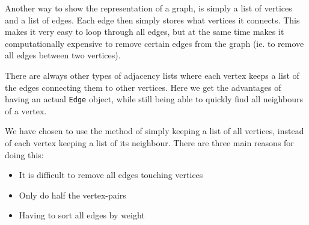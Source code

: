 Another way to show the representation of a graph, is simply a list of vertices and a list of edges. 
Each edge then simply stores what vertices it connects. 
This makes it very easy to loop through all edges, but at the same time makes it computationally expensive to remove certain edges from the graph (ie. 
to remove all edges between two vertices).

There are always other types of adjacency lists where each vertex keeps a list of the edges connecting them to other vertices. Here we get the advantages of having an actual \lstinline|Edge| object, while still being able to quickly find all neighbours of a vertex.

We have chosen to use the method of simply keeping a list of all vertices, instead of each vertex keeping a list of its neighbour. There are three main reasons for doing this:
\begin{itemize}
	\item It is difficult to remove all edges touching vertices
	\item Only do half the vertex-pairs
	\item Having to sort all edges by weight
\end{itemize}
